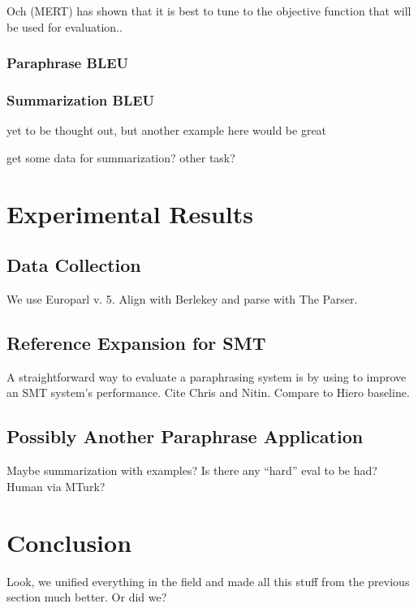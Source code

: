 \documentclass[11pt]{article}
\begin{document}
Och (MERT) has shown that it is best to tune to the objective function
that will be used for evaluation..

\subsubsection{Paraphrase BLEU}

\subsubsection{Summarization BLEU}
yet to be thought out, but another example here
would be great

get some data for summarization? other task?

\section{Experimental Results} \label{results}


\subsection{Data Collection} \label{data_collection}

We use Europarl v. 5. Align with Berlekey and parse with The Parser.


\subsection{Reference Expansion for SMT} \label{smt_application}

A straightforward way to evaluate a paraphrasing system is by using to
improve an SMT system's performance. Cite Chris and Nitin. Compare to Hiero
baseline.  

\subsection{Possibly Another Paraphrase
  Application} \label{other_application}

Maybe summarization with examples? Is there any ``hard'' eval to be had? Human via MTurk?

\section{Conclusion} \label{conclusion}

Look, we unified everything in the field and made all this stuff from
the previous section much better. Or did we?




\nocite{*}
\end{document}
